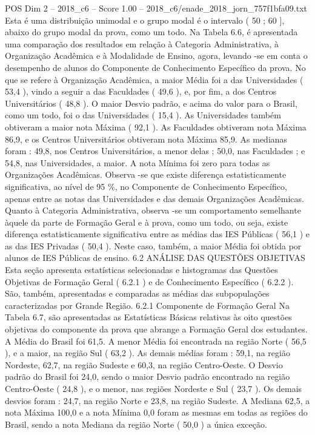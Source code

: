 \begin{textsample}{POS Dim 2 – 2018\_c6 – Score 1.00 – 2018\_c6/enade\_2018\_jorn\_757f1bfa09.txt}
Esta é uma distribuição unimodal e o grupo modal é o intervalo ( 50 ; 60 ], abaixo do grupo modal da prova, como um todo.
Na Tabela 6.6, é apresentada uma comparação dos resultados em relação à Categoria Administrativa, à Organização Acadêmica e à Modalidade de Ensino, agora, levando -se em conta o desempenho de alunos do Componente de Conhecimento Específico da prova.
No que se refere à Organização Acadêmica, a maior Média foi a das Universidades ( 53,4 ), vindo a seguir a das Faculdades ( 49,6 ), e, por fim, a dos Centros Universitários ( 48,8 ).
O maior Desvio padrão, e acima do valor para o Brasil, como um todo, foi o das Universidades ( 15,4 ).
As Universidades também obtiveram a maior nota Máxima ( 92,1 ).
As Faculdades obtiveram nota Máxima 86,9, e os Centros Universitários obtiveram nota Máxima 85,9.
As medianas foram : 49,8, nos Centros Universitários, a menor delas ; 50,0, nas Faculdades ; e 54,8, nas Universidades, a maior.
A nota Mínima foi zero para todas as Organizações Acadêmicas.
Observa -se que existe diferença estatisticamente significativa, ao nível de 95 \%, no Componente de Conhecimento Específico, apenas entre as notas das Universidades e das demais Organizações Acadêmicas.
Quanto à Categoria Administrativa, observa -se um comportamento semelhante àquele da parte de Formação Geral e à prova, como um todo, ou seja, existe diferença estatisticamente significativa entre as médias das IES Públicas ( 56,1 ) e as das IES Privadas ( 50,4 ).
Neste caso, também, a maior Média foi obtida por alunos de IES Públicas de ensino. 6.2 ANÁLISE DAS QUESTÕES OBJETIVAS Esta seção apresenta estatísticas selecionadas e histogramas das Questões Objetivas de Formação Geral ( 6.2.1 ) e de Conhecimento Específico ( 6.2.2 ).
São, também, apresentadas e comparadas as médias das subpopulações caracterizadas por Grande Região. 6.2.1 Componente de Formação Geral Na Tabela 6.7, são apresentadas as Estatísticas Básicas relativas às oito questões objetivas do componente da prova que abrange a Formação Geral dos estudantes.
A Média do Brasil foi 61,5.
A menor Média foi encontrada na região Norte ( 56,5 ), e a maior, na região Sul ( 63,2 ).
As demais médias foram : 59,1, na região Nordeste, 62,7, na região Sudeste e 60,3, na região Centro-Oeste.
O Desvio padrão do Brasil foi 24,0, sendo o maior Desvio padrão encontrado na região Centro-Oeste ( 24,8 ), e o menor, nas regiões Nordeste e Sul ( 23,7 ).
Os demais desvios foram : 24,7, na região Norte e 23,8, na região Sudeste.
A Mediana 62,5, a nota Máxima 100,0 e a nota Mínima 0,0 foram as mesmas em todas as regiões do Brasil, sendo a nota Mediana da região Norte ( 50,0 ) a única exceção.

\end{textsample}
